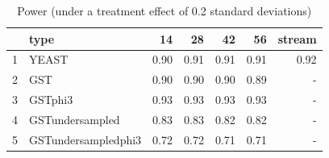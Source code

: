 \begin{table}[ht]
\caption{Power (under a treatment effect of 0.2 standard deviations)}\label{tbl:appendixPower}
\centering
\begin{small}
\begin{tabular}{rlrrrrr}
  \hline
  & type & 14 & 28 & 42 & 56 & stream \\
  \hline
  1 & YEAST & 0.90 & 0.91 & 0.91 & 0.91 & 0.92 \\
  2 & GST & 0.90 & 0.90 & 0.90 & 0.89 & - \\
  3 & GSTphi3 & 0.93 & 0.93 & 0.93 & 0.93 & - \\
  4 & GSTundersampled & 0.83 & 0.83 & 0.82 & 0.82 & - \\
  5 & GSTundersampledphi3 & 0.72 & 0.72 & 0.71 & 0.71 & - \\
   \hline
\end{tabular}
\end{small}
\end{table}
